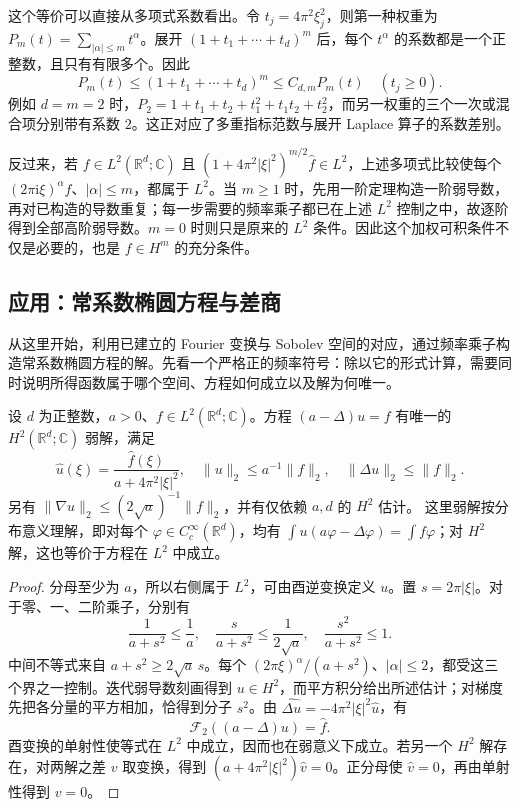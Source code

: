 \ProseParagraphBreak

这个等价可以直接从多项式系数看出。令 \(t_j=4\pi^2\xi_j^2\)，则第一种权重为 \(P_m(t)=\sum_{|\alpha|\leq m}t^\alpha\)。展开 \((1+t_1+\cdots+t_d)^m\) 后，每个 \(t^\alpha\) 的系数都是一个正整数，且只有有限多个。因此
\[
 P_m(t)\leq(1+t_1+\cdots+t_d)^m\leq C_{d,m}P_m(t)
 \quad(t_j\geq0).
\]
例如 \(d=m=2\) 时，\(P_2=1+t_1+t_2+t_1^2+t_1t_2+t_2^2\)，而另一权重的三个一次或混合项分别带有系数 \(2\)。这正对应了多重指标范数与展开 Laplace 算子的系数差别。

反过来，若 \(f\in L^2(\mathbb R^d;\mathbb C)\) 且 \((1+4\pi^2|\xi|^2)^{m/2}\widehat f\in L^2\)，上述多项式比较使每个 \((2\pi\mathrm i\xi)^\alpha\widehat f\)、\(|\alpha|\leq m\)，都属于 \(L^2\)。当 \(m\geq1\) 时，先用一阶定理构造一阶弱导数，再对已构造的导数重复；每一步需要的频率乘子都已在上述 \(L^2\) 控制之中，故逐阶得到全部高阶弱导数。\(m=0\) 时则只是原来的 \(L^2\) 条件。因此这个加权可积条件不仅是必要的，也是 \(f\in H^m\) 的充分条件。

\subsection{应用：常系数椭圆方程与差商}
\label{b2:subsec:040106}

从这里开始，利用已建立的 Fourier 变换与 Sobolev 空间的对应，通过频率乘子构造常系数椭圆方程的解。先看一个严格正的频率符号：除以它的形式计算，需要同时说明所得函数属于哪个空间、方程如何成立以及解为何唯一。

\begin{proposition}[常系数预解方程]\label{b2:prop:04-resolvent-model}
设 \(d\) 为正整数，\(a>0\)、\(f\in L^2(\mathbb R^d;\mathbb C)\)。方程 \((a-\Delta)u=f\) 有唯一的 \(H^2(\mathbb R^d;\mathbb C)\) 弱解，满足
\[
 \widehat u(\xi)=\frac{\widehat f(\xi)}{a+4\pi^2|\xi|^2},
 \quad \|u\|_2\leq a^{-1}\|f\|_2,
 \quad \|\Delta u\|_2\leq\|f\|_2.
\]
另有 \(\|\nabla u\|_2\leq(2\sqrt a)^{-1}\|f\|_2\)，并有仅依赖 \(a,d\) 的 \(H^2\) 估计。
这里弱解按分布意义理解，即对每个 \(\varphi\in C_c^\infty(\mathbb R^d)\)，均有 \(\int u(a\varphi-\Delta\varphi)=\int f\varphi\)；对 \(H^2\) 解，这也等价于方程在 \(L^2\) 中成立。
\end{proposition}
\begin{proof}
分母至少为 \(a\)，所以右侧属于 \(L^2\)，可由酉逆变换定义 \(u\)。置 \(s=2\pi|\xi|\)。对于零、一、二阶乘子，分别有
\[
 \frac1{a+s^2}\leq\frac1a,
 \quad\frac{s}{a+s^2}\leq\frac1{2\sqrt a},
 \quad\frac{s^2}{a+s^2}\leq1.
\]
中间不等式来自 \(a+s^2\geq2\sqrt a\,s\)。每个 \((2\pi\xi)^\alpha/(a+s^2)\)、\(|\alpha|\leq2\)，都受这三个界之一控制。迭代弱导数刻画得到 \(u\in H^2\)，而平方积分给出所述估计；对梯度先把各分量的平方相加，恰得到分子 \(s^2\)。由 \(\widehat{\Delta u}=-4\pi^2|\xi|^2\widehat u\)，有
\[
 \mathcal F_2((a-\Delta)u)=\widehat f.
\]
酉变换的单射性使等式在 \(L^2\) 中成立，因而也在弱意义下成立。若另一个 \(H^2\) 解存在，对两解之差 \(v\) 取变换，得到 \((a+4\pi^2|\xi|^2)\widehat v=0\)。正分母使 \(\widehat v=0\)，再由单射性得到 \(v=0\)。
\end{proof}


